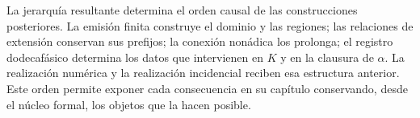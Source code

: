 La jerarquía resultante determina el orden causal de las construcciones
posteriores.
La emisión finita construye el dominio y las regiones; las relaciones de
extensión conservan sus prefijos; la conexión nonádica los prolonga; el
registro dodecafásico determina los datos que intervienen en \(K\) y
en la clausura de \(\alpha\). La realización numérica y la realización
incidencial reciben esa estructura anterior. Este orden permite exponer
cada consecuencia en su capítulo conservando, desde el núcleo formal,
los objetos que la hacen posible.
